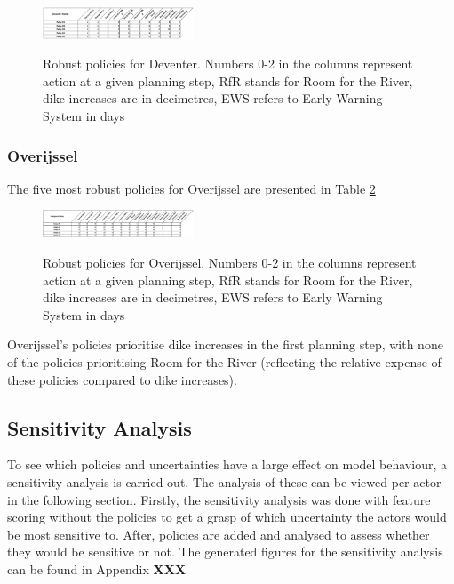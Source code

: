 \begin{figure}[h]
    \centering
    \caption{Robust policies for Deventer. Numbers 0-2 in the columns represent action at a given planning step, RfR stands for Room for the River, dike increases are in decimetres, EWS refers to Early Warning System in days}
    \includegraphics[width=0.4\textwidth]{report/figures/dpols.png}
    \label{fig:dpols}
\end{figure}

\subsubsection{Overijssel}
The five most robust policies for Overijssel are presented in Table \ref{fig:opols}

\begin{figure}[h]
    \centering
    \caption{Robust policies for Overijssel. Numbers 0-2 in the columns represent action at a given planning step, RfR stands for Room for the River, dike increases are in decimetres, EWS refers to Early Warning System in days}
    \includegraphics[width=0.4\textwidth]{report/figures/opols.png}
    \label{fig:opols}
\end{figure}

Overijssel's policies prioritise dike increases in the first planning step, with none of the policies prioritising Room for the River (reflecting the relative expense of these policies compared to dike increases).


\subsection{Sensitivity Analysis}

To see which policies and uncertainties have a large effect on model behaviour, a sensitivity analysis is carried out. The analysis of these can be viewed per actor in the following section. Firstly, the sensitivity analysis was done with feature scoring without the policies to get a grasp of which uncertainty the actors would be most sensitive to. After, policies are added and analysed to assess whether they would be sensitive or not. The generated figures for the sensitivity analysis can be found in Appendix \textbf{XXX}

